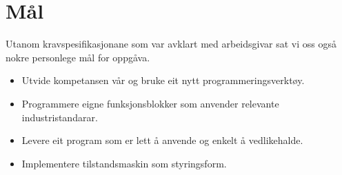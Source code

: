 \section{Mål}
Utanom kravspesifikasjonane som var avklart med arbeidsgivar sat vi oss
også nokre personlege mål for oppgåva.

\begin{itemize}
    \item Utvide kompetansen vår og bruke eit nytt programmeringsverktøy.
    \item Programmere eigne funksjonsblokker som anvender relevante industristandarar.
    \item Levere eit program som er lett å anvende og enkelt å vedlikehalde.
    \item Implementere tilstandsmaskin som styringsform.
\end{itemize}



